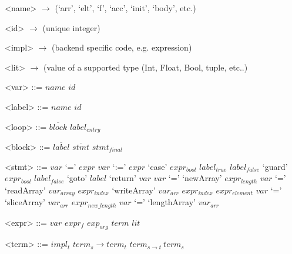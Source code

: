 
\setlength{\grammarindent}{5em} %
\renewcommand{\syntleft}{\normalfont\itshape} %
\renewcommand{\syntright}{}
\renewcommand{\litleft}{\ttfamily} %
\renewcommand{\litright}{}
\newcommand{\many}{\overline} %


\setlength{\grammarparsep}{0pt} %

\begin{grammar}
<name> $\rightarrow$ (`arr', `elt', `f', `acc', `init', `body', etc.)

<id>   $\rightarrow$ (unique integer\footnotemark)

<impl> $\rightarrow$ (backend specific code, e.g.  expression)

<lit>  $\rightarrow$ (\Haskell value of a supported type (Int, Float, Bool, tuple, etc..)

<var>  ::= $name$ $id$

<label> ::= $name$ $id$

\end{grammar}

\setlength{\grammarparsep}{10pt plus 1pt minus 1pt} %
\begin{grammar}
<loop> ::= $\many{block}$ $label_{entry}$

<block> ::= $\many{label}$ $\many{stmt}$ $stmt_{final}$

<stmt> ::= $var$ `=' $expr$
      \alt $var$ `:=' $expr$
      \alt `case' $expr_{bool}$ $label_{true}$ $label_{false}$
      \alt `guard' $expr_{bool}$ $label_{false}$
      \alt `goto' $label$
      \alt `return' $var$
      \alt $var$ `=' `newArray' $expr_{length}$
      \alt $var$ `=' `readArray' $var_{array}$ $expr_{index}$
      \alt `writeArray' $var_{arr}$ $expr_{index}$ $expr_{element}$
      \alt $var$ `=' `sliceArray' $var_{arr}$ $expr_{new\_length}$
      \alt $var$ `=' `lengthArray' $var_{arr}$

<expr> ::= $var$
      \alt $expr_{\mathit{f}}$ $exp_{arg}$
      \alt $term$
      \alt $lit$

<term> ::= $impl_{t}$
      \alt $term_{s} \rightarrow term_{t}$
      \alt $term_{s \rightarrow t}\ term_{s}$

\end{grammar}
